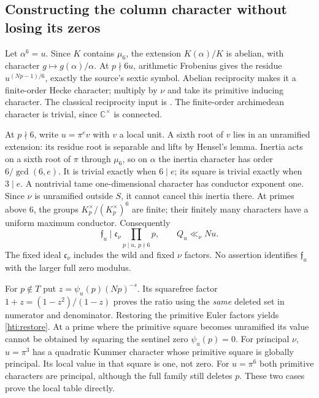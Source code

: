 \documentclass[11pt]{article}
\theoremstyle{definition}\newtheorem{definition}[theorem]{Definition}
\theoremstyle{remark}\newtheorem{remark}[theorem]{Remark}
\begin{document}
\subsection{Constructing the column character without losing its zeros}
Let $\alpha^6=u$. Since $K$ contains $\mu_6$, the extension $K(\alpha)/K$
is abelian, with character $g\mapsto g(\alpha)/\alpha$. At $p\nmid6u$,
arithmetic Frobenius gives the residue $u^{(Np-1)/6}$, exactly the
source's sextic symbol. Abelian reciprocity makes it a finite-order Hecke
character; multiply by $\nu$ and take its primitive inducing character.
The classical reciprocity input is \cite[Theorem~0.8 and Chapter~I,\S1]{MilneCFTTypeI}.
The finite-order archimedean character is trivial, since $\mathbb C^\times$
is connected.

At $p\nmid6$, write $u=\pi^e v$ with $v$ a local unit. A sixth root of
$v$ lies in an unramified extension: its residue root is separable and
lifts by Hensel's lemma. Inertia acts on a sixth root of $\pi$ through
$\mu_6$, so on $\alpha$ the inertia character has order
$6/\gcd(6,e)$. It is trivial exactly when $6\mid e$; its square is
trivial exactly when $3\mid e$. A nontrivial tame one-dimensional
character has conductor exponent one. Since $\nu$ is unramified outside
$S$, it cannot cancel this inertia there. At primes above $6$, the groups
$K_p^\times/(K_p^\times)^6$ are finite; their finitely many characters
have a uniform maximum conductor. Consequently
\[
 \mathfrak f_u\mid \mathfrak c_\nu
       \prod_{p\mid u,\ p\nmid6}p,\qquad
 Q_u\ll_\nu Nu.
\]
The fixed ideal $\mathfrak c_\nu$ includes the wild and fixed $\nu$ factors.
No assertion identifies $\mathfrak f_u$ with the larger full zero modulus.

For $p\notin T$ put $z=\psi_u(p)(Np)^{-s}$. Its squarefree factor
$1+z=(1-z^2)/(1-z)$ proves the ratio using the \emph{same} deleted set
in numerator and denominator. Restoring the primitive Euler factors yields
\eqref{hti:restore}. At a prime where the primitive square becomes
unramified its value cannot be obtained by squaring the sentinel zero
$\psi_u(p)=0$. For principal $\nu$, $u=\pi^3$ has a quadratic Kummer character
whose primitive square is globally principal. Its local value in that
square is one, not zero. For $u=\pi^6$ both primitive characters are
principal, although the full family still deletes $p$. These two cases
prove the local table directly.
\end{document}

